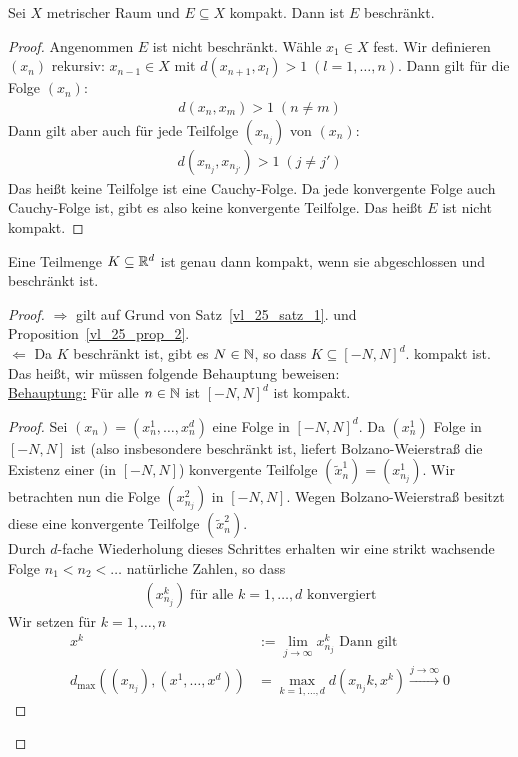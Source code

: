 \begin{Proposition}\label{vl_25_prop_2}%
	Sei $X$ metrischer Raum und $E \subseteq X$ kompakt. Dann ist $E$ beschränkt.
\end{Proposition}

\begin{proof}
	Angenommen $E$ ist nicht beschränkt. Wähle $x_1 \in X$ fest. Wir definieren 
	$(x_n)$ rekursiv: $x_{n-1} \in X$ mit $d(x_{n+1},x_l) > 1 \; (l = 1, \hdots, 
	n)$. Dann gilt für die Folge $(x_n)$:
	\begin{align*}
		d(x_n,x_m) > 1 \;(n\neq m)
	\end{align*}
	Dann gilt aber auch für jede Teilfolge $(x_{n_j})$ von $(x_n)$:
	\begin{align*}
		d(x_{n_j},x_{n_{j\prime}}) > 1 \; (j \neq j\prime)
	\end{align*}
	Das heißt keine Teilfolge ist eine Cauchy-Folge.
	Da jede konvergente Folge auch Cauchy-Folge ist, gibt es also keine konvergente 
	Teilfolge. Das heißt $E$ ist nicht kompakt.
\end{proof}

\begin{theorem}\label{satz_v_heine_borel}
	Eine Teilmenge $K \subseteq \mathbb{R}^d$ ist genau dann kompakt, wenn sie 
	abgeschlossen und beschränkt ist.
\end{theorem}

\begin{proof}
$\Rightarrow$ gilt auf Grund von Satz~\ref{vl_25_satz_1}. und 
Proposition~\ref{vl_25_prop_2}.\\
$\Leftarrow$ Da $K$ beschränkt ist, gibt es $N \in \mathbb{N}$, so dass $K \subseteq 
[-N,N]^d$. kompakt ist.\\
Das heißt, wir müssen folgende Behauptung beweisen:\\
\underline{Behauptung:} Für alle $n\in \mathbb{N}$ ist $[-N, N]^d$ ist kompakt. 
\begin{proof}
	Sei $(x_n) = (x_n^1, \hdots, x_n^d)$ eine Folge in $[-N,N]^d$. Da 
	$(x_n^1)$ Folge in $[-N,N]$ ist (also insbesondere beschränkt ist, 
	liefert Bolzano-Weierstraß die Existenz einer (in $[-N,N]$) konvergente 
	Teilfolge $(\tilde{x}_n^1)= (x_{n_j}^1)$. Wir betrachten nun die Folge 
	$(x_{n_j}^2)$ in $[-N,N]$. Wegen Bolzano-Weierstraß besitzt diese 
	eine konvergente Teilfolge $(\tilde{x}_n^2)$.\\
	Durch $d$-fache Wiederholung dieses Schrittes erhalten wir eine strikt wachsende 
	Folge $n_1 < n_2 < \hdots$ natürliche Zahlen, so dass 
	\begin{align*}
		(x_{n_j}^k) \; \text{für alle } k = 1, \hdots, d \text{ konvergiert}
	\end{align*}
	Wir setzen für $k = 1, \hdots, n$
	\begin{align*}
		x^k & := \lim\limits_{j \rightarrow \infty}x_{n_j}^k \text{ Dann gilt} \\
		d_{\max}((x_{n_j}), (x^1, \hdots, x^d)) & = 
			\max_{k = 1, \hdots, d} d(x_{n_j}	k, x^k) 
			\xrightarrow{j \rightarrow \infty} 0
	\end{align*}
\end{proof}
\end{proof}

